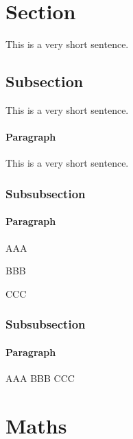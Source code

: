 \maketitle



\section{\label{sec:level1}Section}

This is a very short sentence.\cite{zeilinger_experiment_1999}

\subsection{\label{sec:level2}Subsection}

This is a very short sentence.

\paragraph{Paragraph}
This is a very short sentence.


\subsubsection{Subsubsection}

\paragraph{Paragraph} %
AAA

BBB

CCC

\subsubsection{Subsubsection}

\paragraph{Paragraph}
AAA
BBB
CCC



\section{Maths}
%

